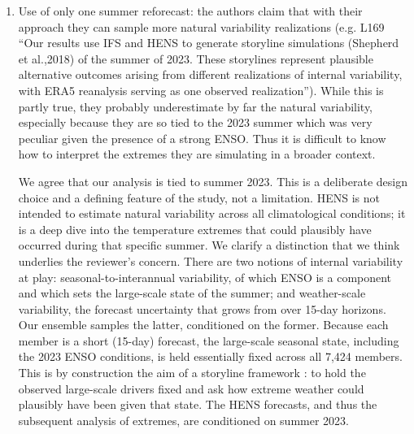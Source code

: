 \documentclass[11pt]{article}
\newcommand{\newTxt}{\textcolor{cadmiumgreen}}
\begin{document}
\begin{enumerate}
    \newTxt{We thank the reviewer for raising this point and apologize for the unclear framing of the paper overall. The abstract and introduction now clearly state the overall objective of our manuscript: how much worse the record-breaking 2023 boreal summertime heat extremes might plausibly have become, given identical large-scale conditions (lines 24 and 88-89). In response to your feedback we have removed mention of non-heat-related extremes, as well as reference to the specific warming level associated with 2023. Furthermore, we attempt to provide a clear definition of what is meany by ``the large-scale atmospheric state'' in the new Section 2.1 (lines 129-152) as well as a clear set of criteria for data sets that can be used to cleanly answer this question.}



    \item Use of only one summer reforecast: the authors claim that with their approach they can sample more natural variability realizations (e.g. L169 “Our results use IFS and HENS to generate storyline simulations (Shepherd et al.,2018) of the summer of 2023. These storylines represent plausible alternative outcomes arising from different realizations of internal variability, with ERA5 reanalysis serving as one observed realization”). While this is partly true, they probably underestimate by far the natural variability, especially because they are so tied to the 2023 summer which was very peculiar given the presence of a strong ENSO. Thus it is difficult to know how to interpret the extremes they are simulating in a broader context. 

    \newTxt{We agree that our analysis is tied to summer 2023.  This is a deliberate design choice and a defining feature of the study, not a limitation. HENS is not intended to estimate natural variability across all climatological conditions; it is a deep dive into the temperature extremes that could plausibly have occurred during that specific summer.
We clarify a distinction that we think underlies the reviewer's concern. There are two notions of internal variability at play: seasonal-to-interannual variability, of which ENSO is a component and which sets the large-scale state of the summer; and weather-scale variability, the forecast uncertainty that grows from  over 15-day horizons. Our ensemble samples the latter, conditioned on the former. Because each member is a short (15-day) forecast, the large-scale seasonal state, including the 2023 ENSO conditions, is held essentially fixed across all 7,424 members. This is by construction the aim of a storyline framework \citep{Shepherd2018}: to hold the observed large-scale drivers fixed and ask how extreme weather could plausibly have been given that state. The HENS forecasts, and thus the subsequent analysis of extremes, are conditioned on summer 2023.}


\end{enumerate}
\end{document}
